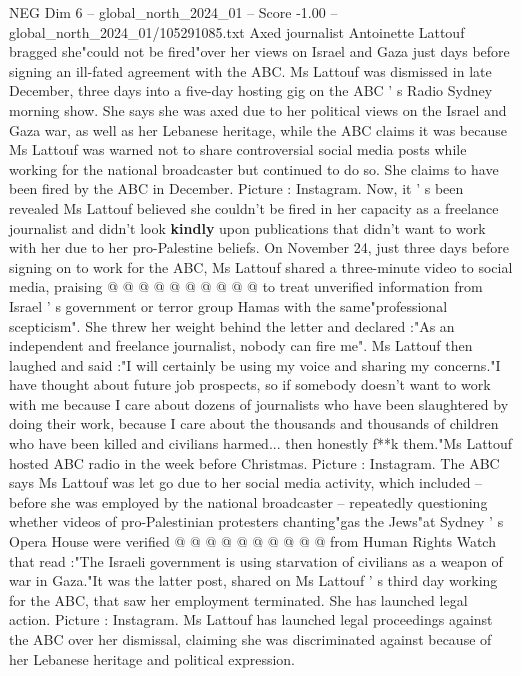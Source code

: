\begin{textsample}{NEG Dim 6 – global\_north\_2024\_01 – Score -1.00 – global\_north\_2024\_01/105291085.txt}  \label{ex:f6_neg_360}
Axed journalist Antoinette Lattouf bragged she"could not be fired"over her views on Israel and Gaza just days before signing an ill-fated agreement with the ABC.
Ms Lattouf was dismissed in late December, three days into a five-day hosting gig on the ABC ' s Radio Sydney morning show.
She says she was axed due to her political views on the Israel and Gaza war, as well as her Lebanese heritage, while the ABC claims it was because Ms Lattouf was warned not to share controversial social media posts while working for the national broadcaster but continued to do so.
She claims to have been fired by the ABC in December.
Picture : Instagram.
Now, it ' s been revealed Ms Lattouf believed she couldn't be fired in her capacity as a freelance journalist and didn't look \textbf{kindly} upon publications that didn't want to work with her due to her pro-Palestine beliefs.
On November 24, just three days before signing on to work for the ABC, Ms Lattouf shared a three-minute video to social media, praising @ @ @ @ @ @ @ @ @ @ to treat unverified information from Israel ' s government or terror group Hamas with the same"professional scepticism".
She threw her weight behind the letter and declared :"As an independent and freelance journalist, nobody can fire me".
Ms Lattouf then laughed and said :"I will certainly be using my voice and sharing my concerns."I have thought about future job prospects, so if somebody doesn't want to work with me because I care about dozens of journalists who have been slaughtered by doing their work, because I care about the thousands and thousands of children who have been killed and civilians harmed... then honestly f**k them."Ms Lattouf hosted ABC radio in the week before Christmas.
Picture : Instagram.
The ABC says Ms Lattouf was let go due to her social media activity, which included -- before she was employed by the national broadcaster -- repeatedly questioning whether videos of pro-Palestinian protesters chanting"gas the Jews"at Sydney ' s Opera House were verified @ @ @ @ @ @ @ @ @ @ from Human Rights Watch that read :"The Israeli government is using starvation of civilians as a weapon of war in Gaza."It was the latter post, shared on Ms Lattouf ' s third day working for the ABC, that saw her employment terminated.
She has launched legal action.
Picture : Instagram.
Ms Lattouf has launched legal proceedings against the ABC over her dismissal, claiming she was discriminated against because of her Lebanese heritage and political expression.

\end{textsample}
